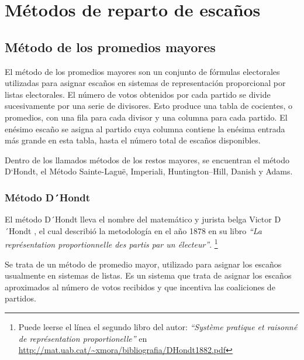 \documentclass[12pt,a4paper,]{book}
\let\rmarkdownfootnote\footnote%
\def\footnote{\protect\rmarkdownfootnote}
\numberwithin{dummy}{section}
\theoremstyle{ocrenumbox}
\theoremstyle{blacknumex}
\theoremstyle{blacknumbox}
\theoremstyle{ocrenum}
\theoremstyle{ocrenum}
\begin{document}
\hypertarget{muxe9todos-de-reparto-de-escauxf1os}{%
\chapter{Métodos de reparto de
escaños}\label{muxe9todos-de-reparto-de-escauxf1os}}

\hypertarget{muxe9todo-de-los-promedios-mayores}{%
\section{Método de los promedios
mayores}\label{muxe9todo-de-los-promedios-mayores}}

El método de los promedios mayores son un conjunto de fórmulas
electorales utilizadas para asignar escaños en sistemas de
representación proporcional por listas electorales. El número de votos
obtenidos por cada partido se divide sucesivamente por una serie de
divisores. Esto produce una tabla de cocientes, o promedios, con una
fila para cada divisor y una columna para cada partido. El enésimo
escaño se asigna al partido cuya columna contiene la enésima entrada más
grande en esta tabla, hasta el número total de escaños disponibles.

Dentro de los llamados métodos de los restos mayores, se encuentran el
método D`Hondt, el Método Sainte-Laguë, Imperiali, Huntington--Hill,
Danish y Adams.

\hypertarget{muxe9todo-dhondt}{%
\subsection{Método D´Hondt}\label{muxe9todo-dhondt}}

El método D´Hondt lleva el nombre del matemático y jurista belga Victor
D´Hondt , el cual describió la metodología en el año 1878 en su libro
\emph{``La représentation proportionnelle des partis par un électeur''}.
\footnote{Puede leerse el línea el segundo libro del autor:
  \emph{``Système pratique et raisonné de représentation
  proportionelle''} en
  \url{http://mat.uab.cat/~xmora/bibliografia/DHondt1882.pdf}}

Se trata de un método de promedio mayor, utilizado para asignar los
escaños usualmente en sistemas de listas. Es un sistema que trata de
asignar los escaños aproximados al número de votos recibidos y que
incentiva las coaliciones de partidos.
\end{document}
